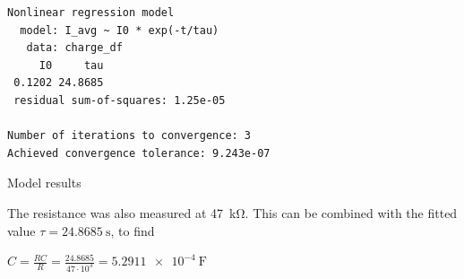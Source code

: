 \documentclass[a4paper,11pt]{article}
\newenvironment{longlisting}
{\addvspace{\baselineskip}\captionsetup{type=listing}}
{\addvspace{\baselineskip}}
\begin{document}
\begin{longlisting}
\begin{verbatim}
Nonlinear regression model
  model: I_avg ~ I0 * exp(-t/tau)
   data: charge_df
     I0     tau
 0.1202 24.8685
 residual sum-of-squares: 1.25e-05

Number of iterations to convergence: 3
Achieved convergence tolerance: 9.243e-07
\end{verbatim}
\caption{Model results}
\end{longlisting}

The resistance was also measured at \si{47\kilo\ohm}. This can be combined with
the fitted value $\tau = \SI{24.8685}{\second}$, to find

\begin{math}
C = \frac{RC}{R} = \frac{24.8685}{47 \cdot 10^3} = \SI{5.2911e-4}{\farad}
\end{math}
\end{document}
